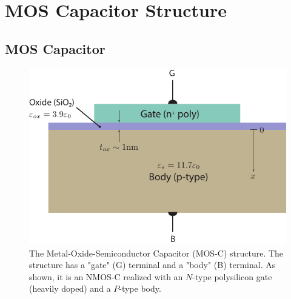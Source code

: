 \section{MOS Capacitor Structure}
\subsection{MOS Capacitor}
\begin{figure}[tbh]
\centering
\includegraphics[width=.65\columnwidth]{mos_cap_structure}
\caption{The Metal-Oxide-Semiconductor Capacitor  (MOS-C) structure.  The structure has a "gate" (G) terminal and a "body" (B) terminal.  As shown, it is an NMOS-C realized with an $N$-type polysilicon gate (heavily doped) and a $P$-type body.}
\label{fig:mos_cap}
\end{figure}
